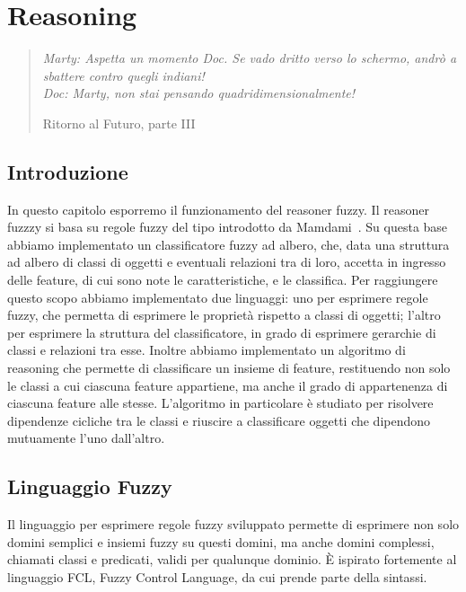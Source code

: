 \chapter{Reasoning}
\label{cap:reasoning}
\thispagestyle{empty}

\begin{quotation}
{\footnotesize
\noindent \emph{Marty: Aspetta un momento Doc. Se vado dritto verso lo schermo, andrò a sbattere contro quegli indiani! \\
Doc: Marty, non stai pensando quadridimensionalmente!}
\begin{flushright}
Ritorno al Futuro, parte III
\end{flushright}
}
\end{quotation}
\vspace{0.5cm}

\section{Introduzione}

In questo capitolo esporremo il funzionamento del reasoner fuzzy. Il reasoner fuzzzy si basa su regole fuzzy del tipo introdotto da Mamdami~\cite{mamdani1975experiment}. 
Su questa base abbiamo implementato un classificatore fuzzy ad albero, che, data una struttura ad albero di classi di oggetti e eventuali relazioni tra di loro, accetta in ingresso delle feature, di cui sono note le caratteristiche, e le classifica.
Per raggiungere questo scopo abbiamo implementato due linguaggi: uno per esprimere regole fuzzy, che permetta di esprimere le proprietà rispetto a classi di oggetti; l'altro per esprimere la struttura del classificatore, in grado di esprimere gerarchie di classi e relazioni tra esse.
Inoltre abbiamo implementato un algoritmo di reasoning che permette di classificare un insieme di feature, restituendo non solo le classi a cui ciascuna feature appartiene, ma anche il grado di appartenenza di ciascuna feature alle stesse.
L'algoritmo in particolare è studiato per risolvere dipendenze cicliche tra le classi e riuscire a classificare oggetti che dipendono mutuamente l'uno dall'altro.

\section{Linguaggio Fuzzy}
Il linguaggio per esprimere regole fuzzy sviluppato permette di esprimere non solo domini semplici e insiemi fuzzy su questi domini, ma anche domini complessi, chiamati classi e predicati, validi per qualunque dominio. \`E ispirato fortemente al linguaggio FCL, Fuzzy Control Language, da cui prende parte della sintassi.

